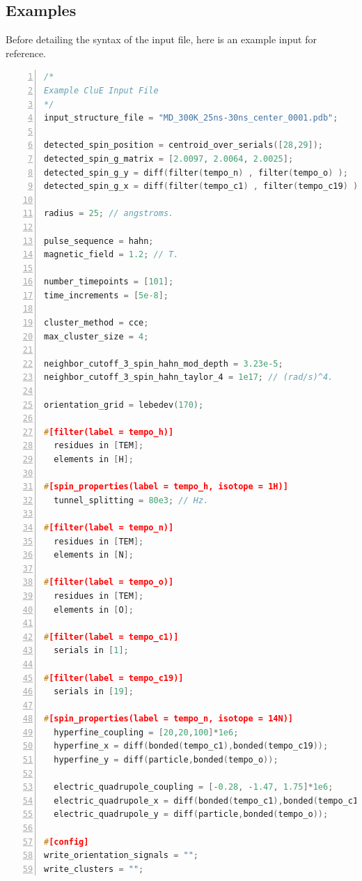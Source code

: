 \documentclass{book}
\begin{document}
\subsection{Examples}
Before detailing the syntax of the input file, here is an example input for
reference.
\begin{lstlisting}[frame=single,numbers=left,language=c]
/*
Example CluE Input File
*/
input_structure_file = "MD_300K_25ns-30ns_center_0001.pdb";

detected_spin_position = centroid_over_serials([28,29]);
detected_spin_g_matrix = [2.0097, 2.0064, 2.0025];
detected_spin_g_y = diff(filter(tempo_n) , filter(tempo_o) );
detected_spin_g_x = diff(filter(tempo_c1) , filter(tempo_c19) );

radius = 25; // angstroms.

pulse_sequence = hahn;
magnetic_field = 1.2; // T.

number_timepoints = [101];
time_increments = [5e-8];

cluster_method = cce;
max_cluster_size = 4;

neighbor_cutoff_3_spin_hahn_mod_depth = 3.23e-5; 
neighbor_cutoff_3_spin_hahn_taylor_4 = 1e17; // (rad/s)^4.

orientation_grid = lebedev(170);

#[filter(label = tempo_h)]
  residues in [TEM];
  elements in [H];

#[spin_properties(label = tempo_h, isotope = 1H)]
  tunnel_splitting = 80e3; // Hz.

#[filter(label = tempo_n)]
  residues in [TEM];
  elements in [N];

#[filter(label = tempo_o)]
  residues in [TEM];
  elements in [O];

#[filter(label = tempo_c1)]
  serials in [1];

#[filter(label = tempo_c19)]
  serials in [19];
  
#[spin_properties(label = tempo_n, isotope = 14N)]
  hyperfine_coupling = [20,20,100]*1e6;
  hyperfine_x = diff(bonded(tempo_c1),bonded(tempo_c19));
  hyperfine_y = diff(particle,bonded(tempo_o));

  electric_quadrupole_coupling = [-0.28, -1.47, 1.75]*1e6;
  electric_quadrupole_x = diff(bonded(tempo_c1),bonded(tempo_c19));
  electric_quadrupole_y = diff(particle,bonded(tempo_o));

#[config]
write_orientation_signals = "";
write_clusters = "";
\end{lstlisting}
\end{document}
